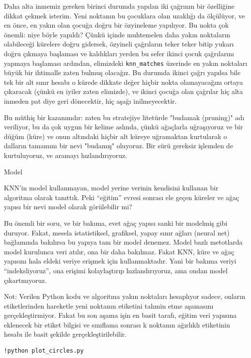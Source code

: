 \documentclass[12pt,fleqn]{article}\usepackage{../../common}
\begin{document}
Daha alta inmemiz gereken birinci durumda yapılan iki çağrının bir
özelliğine dikkat çekmek isterim. Yeni noktanın bu çocuklara olan
uzaklığı da ölçülüyor, ve en önce, en yakın olan çocuğa doğru bir
özyineleme yapılıyor.  Bu nokta çok önemli: niye böyle yapıldı? Çünkü
içinde muhtemelen daha yakın noktaların olabileceği kürelere doğru
gidersek, özyineli çağrıların teker teker bitip yukarı doğru çıkmaya
başlaması ve kaldıkları yerden bu sefer ikinci çocuk çağrılarını
yapmaya başlaması ardından, elimizdeki \verb!knn_matches!
üzerinde en yakın noktaları büyük bir ihtimalle zaten bulmuş
olacağız. Bu durumda ikinci çağrı yapılsa bile tek bir alt sınır
hesabı o kürede dikkate değer hiçbir nokta olamayacağını ortaya
çıkaracak (çünkü en iyiler zaten elimizde), ve ikinci çocuğa olan
çağrılar hiç alta inmeden pat diye geri dönecektir, hiç aşağı
inilmeyecektir.

Bu müthiş bir kazanımdır: zaten bu stratejiye litetürde "budamak (pruning)"
adı veriliyor, bu da çok uygun bir kelime aslında, çünkü ağaçlarla
uğraşıyoruz ve bir düğüm (küre) ve onun altındaki hiçbir alt küreye
uğramaktan kurtularak o dalların tamamını bir nevi "budamış" oluyoruz. Bir
sürü gereksiz işlemden de kurtuluyoruz, ve aramayı hızlandırıyoruz.

Model

KNN'in model kullanmayan, model yerine verinin kendisini kullanan bir
algoritma olarak tanıttık. Peki ``eğitim'' evresi sonrası ele geçen küreler
ve ağaç yapısı bir nevi model olarak görülebilir mi? 

Bu önemli bir soru, ve bir bakıma, evet ağaç yapısı sanki bir modelmiş gibi
duruyor. Fakat, mesela istatistiksel, grafiksel, yapay sınır ağları (neural
net) bağlamında bakılırsa bu yapıya tam bir model denemez. Model bazlı
metotlarda model kurulunca veri atılır, ona bir daha bakılmaz. Fakat KNN,
küre ve ağaç yapısını hala eldeki veriye erişmek için kullanmaktadır. Yani
bir bakıma veriyi ``indeksliyoruz'', ona erişimi kolaylaştırıp
hızlandırıyoruz, ama ondan model çıkartmıyoruz. 

Not: Verilen Python kodu ve algoritma yakın noktaları hesaplıyor sadece,
onların etiketlerinden hareketle yeni noktanın etiketini tahmin etme
aşamasını gerçekleştirmiyor. Fakat bu son aşama işin en basit tarafı,
eğitim veri yapısına eklenecek bir etiket bilgisi ve sınıflama sonrası k
noktanın ağırlıklı etiketinin hesabı ile basit şekilde
gerçekleştirilebilir.

\begin{verbatim}
!python plot_circles.py
\end{verbatim}
\end{document}

